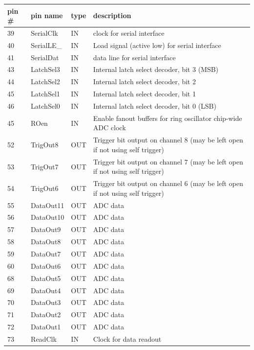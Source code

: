 \documentclass[12pt]{article}
\begin{document}
\begin{center}
\begin{longtable}[h!]{|l|l|l| p{11cm}|}
  \hline
   pin \# & pin name & type & description\\ \hline \hline
   39 & SerialClk & IN & clock for serial interface \\ \hline
   40 & SerialLE\_ & IN & Load signal (active low) for serial interface\\ \hline
   41 & SerialDat & IN & data line for serial interface\\ \hline
   43 & LatchSel3 & IN & Internal latch select decoder, bit 3 (MSB)\\ \hline
   44 & LatchSel2 & IN & Internal latch select decoder, bit 2 \\ \hline
   45 & LatchSel1 & IN & Internal latch select decoder, bit 1 \\ \hline
   46 & LatchSel0 & IN & Internal latch select decoder, bit 0 (LSB)\\ \hline
   45 & ROen & IN & Enable fanout buffers for ring oscillator chip-wide ADC clock \\ \hline
   52 & TrigOut8 & OUT & Trigger bit output on channel 8 (may be left open if not using self trigger)\\ \hline
   53 & TrigOut7 & OUT & Trigger bit output on channel 7 (may be left open if not using self trigger)\\ \hline
   54 & TrigOut6 & OUT & Trigger bit output on channel 6 (may be left open if not using self trigger)\\ \hline
   55 & DataOut11 & OUT & ADC data\\ \hline
   56 & DataOut10 & OUT & ADC data\\ \hline
   57 & DataOut9 & OUT & ADC data\\ \hline
   58 & DataOut8 & OUT & ADC data\\ \hline
   59 & DataOut7 & OUT & ADC data\\ \hline
   60 & DataOut6 & OUT & ADC data\\ \hline
   68 & DataOut5 & OUT & ADC data\\ \hline
   69 & DataOut4 & OUT & ADC data\\ \hline
   70 & DataOut3 & OUT & ADC data\\ \hline
   71 & DataOut2 & OUT & ADC data\\ \hline
   72 & DataOut1 & OUT & ADC data\\ \hline
   73 & ReadClk  & IN & Clock for data readout\\ \hline

\end{longtable}
\end{center}
\end{document}

